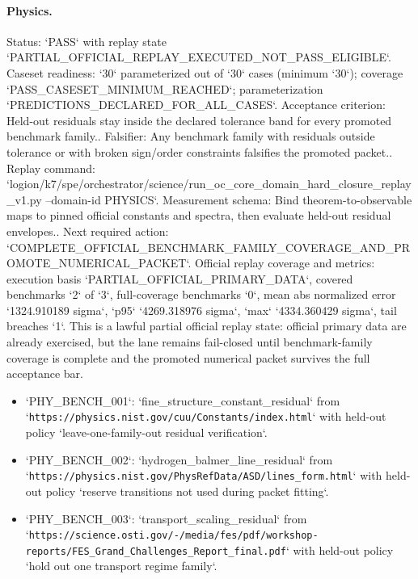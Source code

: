 \paragraph{Physics.}
Status: `PASS` with replay state `PARTIAL\_OFFICIAL\_REPLAY\_EXECUTED\_NOT\_PASS\_ELIGIBLE`.
Caseset readiness: `30` parameterized out of `30` cases (minimum `30`); coverage `PASS\_CASESET\_MINIMUM\_REACHED`; parameterization `PREDICTIONS\_DECLARED\_FOR\_ALL\_CASES`.
Acceptance criterion: Held-out residuals stay inside the declared tolerance band for every promoted benchmark family..
Falsifier: Any benchmark family with residuals outside tolerance or with broken sign/order constraints falsifies the promoted packet..
Replay command: `logion/k7/spe/orchestrator/science/run\_oc\_core\_domain\_hard\_closure\_replay\_v1.py --domain-id PHYSICS`.
Measurement schema: Bind theorem-to-observable maps to pinned official constants and spectra, then evaluate held-out residual envelopes..
Next required action: `COMPLETE\_OFFICIAL\_BENCHMARK\_FAMILY\_COVERAGE\_AND\_PROMOTE\_NUMERICAL\_PACKET`.
Official replay coverage and metrics: execution basis `PARTIAL\_OFFICIAL\_PRIMARY\_DATA`, covered benchmarks `2` of `3`, full-coverage benchmarks `0`, mean abs normalized error `1324.910189 sigma`, `p95` `4269.318976 sigma`, `max` `4334.360429 sigma`, tail breaches `1`.
This is a lawful partial official replay state: official primary data are already exercised, but the lane remains fail-closed until benchmark-family coverage is complete and the promoted numerical packet survives the full acceptance bar.
\begin{itemize}
\item `PHY\_BENCH\_001`: `fine\_structure\_constant\_residual` from `\texttt{https://physics.nist.gov/cuu/Constants/index.html}` with held-out policy `leave-one-family-out residual verification`.
\item `PHY\_BENCH\_002`: `hydrogen\_balmer\_line\_residual` from `\texttt{https://physics.nist.gov/PhysRefData/ASD/lines\_form.html}` with held-out policy `reserve transitions not used during packet fitting`.
\item `PHY\_BENCH\_003`: `transport\_scaling\_residual` from `\texttt{https://science.osti.gov/-/media/fes/pdf/workshop-reports/FES\_Grand\_Challenges\_Report\_final.pdf}` with held-out policy `hold out one transport regime family`.
\end{itemize}

